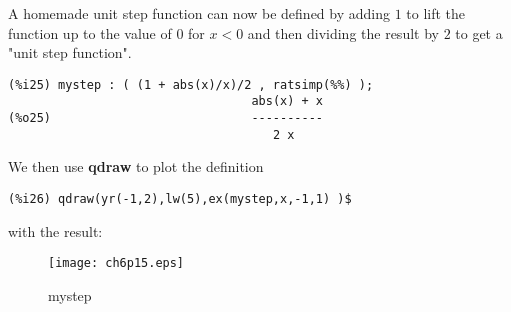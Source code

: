 \documentclass[12pt]{article}
\begin{document}
\newpage

A homemade unit step function can now be defined by adding $1$ to lift the
  function up to the value of $0$ for $ x < 0$ and then dividing the result
  by $2$ to get a "unit step function".
\small
\begin{verbatim}
(%i25) mystep : ( (1 + abs(x)/x)/2 , ratsimp(%%) );
                                  abs(x) + x
(%o25)                            ----------
                                     2 x
\end{verbatim}
\normalsize
We then use \textbf{qdraw} to plot the definition
\small
\begin{verbatim}
(%i26) qdraw(yr(-1,2),lw(5),ex(mystep,x,-1,1) )$
\end{verbatim}
\normalsize
with the result:
\begin{figure} [h]
   \centerline{\texttt{[image: ch6p15.eps]} }
	\caption{ mystep }
\end{figure} 
\end{document}

